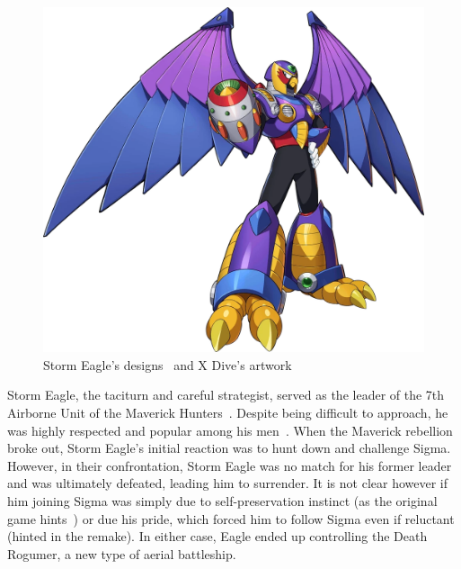\begin{figure}[htp]
	\includegraphics[height=\portraitsize]{figures/X1/Storm_eagle/Storm_Eagle.png}
	\caption{Storm Eagle's designs~\cite{book:MMX_Complete_art} and X Dive's artwork}
\end{figure}
Storm Eagle, the taciturn and careful strategist, served as the leader of the 7th Airborne Unit of the Maverick Hunters~\cite{wiki:Storm_eagle}. Despite being difficult to approach, he was highly respected and popular among his men~\cite{MHX:manual}. When the Maverick rebellion broke out, Storm Eagle's initial reaction was to hunt down and challenge Sigma. However, in their confrontation, Storm Eagle was no match for his former leader and was ultimately defeated, leading him to surrender. It is not clear however if him joining Sigma was simply due to self-preservation instinct (as the original game  hints~\cite{Xcoll1:Manual_X1}) or due his pride, which forced him to follow Sigma even if reluctant (hinted in the remake). In either case, Eagle ended up controlling the Death Rogumer, a new type of aerial battleship.
